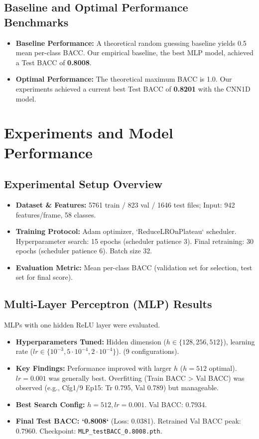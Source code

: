 \documentclass[11pt, a4paper]{article}
\newcommand{\code}[1]{\texttt{#1}}
\begin{document}
\subsection{Baseline and Optimal Performance Benchmarks}
\begin{itemize}
    \item \textbf{Baseline Performance:} A theoretical random guessing baseline yields 0.5 mean per-class BACC. Our empirical baseline, the best MLP model, achieved a Test BACC of \textbf{0.8008}.
    \item \textbf{Optimal Performance:} The theoretical maximum BACC is 1.0. Our experiments achieved a current best Test BACC of \textbf{0.8201} with the CNN1D model.
\end{itemize}

\section{Experiments and Model Performance}
\label{sec:experiments}

\subsection{Experimental Setup Overview}
\begin{itemize}
    \item \textbf{Dataset \& Features:} 5761 train / 823 val / 1646 test files; Input: 942 features/frame, 58 classes.
    \item \textbf{Training Protocol:} Adam optimizer, `ReduceLROnPlateau` scheduler. Hyperparameter search: 15 epochs (scheduler patience 3). Final retraining: 30 epochs (scheduler patience 6). Batch size 32.
    \item \textbf{Evaluation Metric:} Mean per-class BACC (validation set for selection, test set for final score).
\end{itemize}

\subsection{Multi-Layer Perceptron (MLP) Results}
\label{ssec:mlp_results}
MLPs with one hidden ReLU layer were evaluated.
\begin{itemize}
    \item \textbf{Hyperparameters Tuned:} Hidden dimension ($h \in \{128, 256, 512\}$), learning rate ($lr \in \{10^{-3}, 5 \cdot 10^{-4}, 2 \cdot 10^{-4}\}$). (9 configurations).
    \item \textbf{Key Findings:} Performance improved with larger $h$ ($h=512$ optimal). $lr=0.001$ was generally best. Overfitting (Train BACC > Val BACC) was observed (e.g., Cfg1/9 Ep15: Tr 0.795, Val 0.789) but manageable.
    \item \textbf{Best Search Config:} $h=512, lr=0.001$. Val BACC: 0.7934.
    \item \textbf{Final Test BACC: `0.8008`} (Loss: 0.0381). Retrained Val BACC peak: 0.7960. Checkpoint: \code{MLP\_testBACC\_0.8008.pth}.
\end{itemize}
\end{document}
